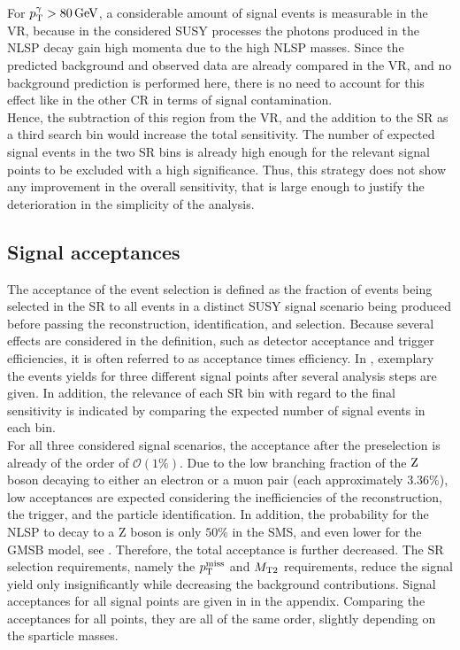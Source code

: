 For $p_{\mathrm{T}}^{\gamma} >80\,\text{Ge\hspace{-.08em}V}$, a considerable amount of signal events is measurable in the VR, because in the considered SUSY processes the photons produced in the NLSP decay gain high momenta due to the high NLSP masses. Since the predicted background and observed data are already compared in the VR, and no background prediction is performed here, there is no need to account for this effect like in the other CR in terms of signal contamination.\\
Hence, the subtraction of this region from the VR, and the addition to the SR as a third search bin would increase the total sensitivity. The number of expected signal events in the two SR bins is already high enough for the relevant signal points to be excluded with a high significance. Thus, this strategy does not show any improvement in the overall sensitivity, that is large enough to justify the deterioration in the simplicity of the analysis.


\subsection*{Signal acceptances}
The acceptance of the event selection is defined as the fraction of events being selected in the SR to all events in a distinct SUSY signal scenario being produced before passing the reconstruction, identification, and selection. Because several effects are considered in the definition, such as detector acceptance and trigger efficiencies, it is often referred to as acceptance times efficiency. In , exemplary the events yields for three different signal points after several analysis steps are given. In addition, the relevance of each SR bin with regard to the final sensitivity is indicated by comparing the expected number of signal events in each bin.\\
For all three considered signal scenarios, the acceptance after the preselection is already of the order of $\mathcal{O}(1\%)$. Due to the low branching fraction of the $\mathrm{Z}$ boson decaying to either an electron or a muon pair (each approximately $3.36\%$), low acceptances are expected considering the inefficiencies of the reconstruction, the trigger, and the particle identification. In addition, the probability for the NLSP to decay to a Z boson is only $50\%$ in the SMS, and even lower for the GMSB model, see . Therefore, the total acceptance is further decreased. The SR selection requirements, namely the $p_{\mathrm{T}}^\text{miss}$ and $M_{\mathrm{T2}}$ requirements, reduce the signal yield only insignificantly while decreasing the background contributions. Signal acceptances for all signal points are given in  in the appendix. Comparing the acceptances for all points, they are all of the same order, slightly depending on the sparticle masses.

